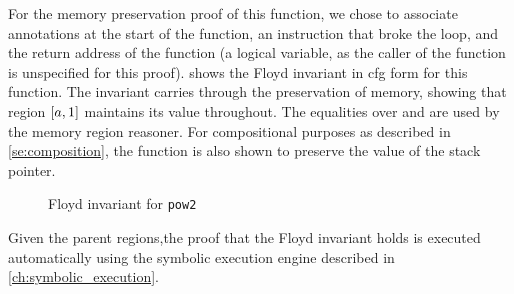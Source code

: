 For the memory preservation proof of this function, we chose to associate annotations
at the start of the function, an instruction that broke the loop,
and the return address of the function
(a logical variable, as the caller of the function is unspecified for this proof).
 shows the Floyd invariant in \ac{cfg} form for this function.
The invariant carries through the preservation of memory,
showing that region $[a,1]$ maintains its value throughout.
The equalities over  and 
are used by the memory region reasoner.
For compositional purposes as described in \cref{se:composition},
the function is also shown to preserve the value of the stack pointer.
\begin{figure}
  \centering
  \caption{Floyd invariant for \texttt{pow2}}\label{fig:pow2cfg}
\end{figure}
Given the parent regions,the proof that the Floyd invariant holds
is executed automatically using the symbolic execution engine
described in \cref{ch:symbolic_execution}.

